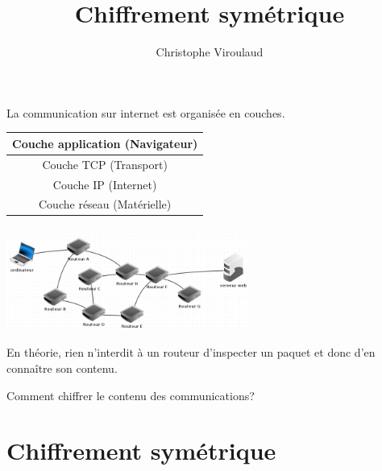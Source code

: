 \documentclass[svgnames,11pt]{beamer}
\author[]{Christophe Viroulaud}
\title{Chiffrement symétrique}
\date{\framebox{\textbf{Archi 20}}}
\institute{Terminale - NSI}
\begin{document}
\begin{frame}
    \titlepage
\end{frame}
\begin{frame}
    \frametitle{}

    La communication sur internet est organisée en couches.
    \begin{center}
        \begin{tabular}{|c|}
            \hline
            Couche application (Navigateur) \\
            \hline
            Couche TCP (Transport)          \\
            \hline
            Couche IP (Internet)            \\
            \hline
            Couche réseau (Matérielle)      \\
            \hline
        \end{tabular}
    \end{center}

\end{frame}
\begin{frame}
    \frametitle{}
    \begin{center}
        \centering
        \includegraphics[width=8cm]{ressources/serveur-web.png}
        \label{IMG}
    \end{center}
    En théorie, rien n'interdit à un routeur d'inspecter un paquet et donc d'en connaître son contenu.
    \begin{framed}
        \centering Comment chiffrer le contenu des communications?
    \end{framed}
\end{frame}
\section{Chiffrement symétrique}
\end{document}
